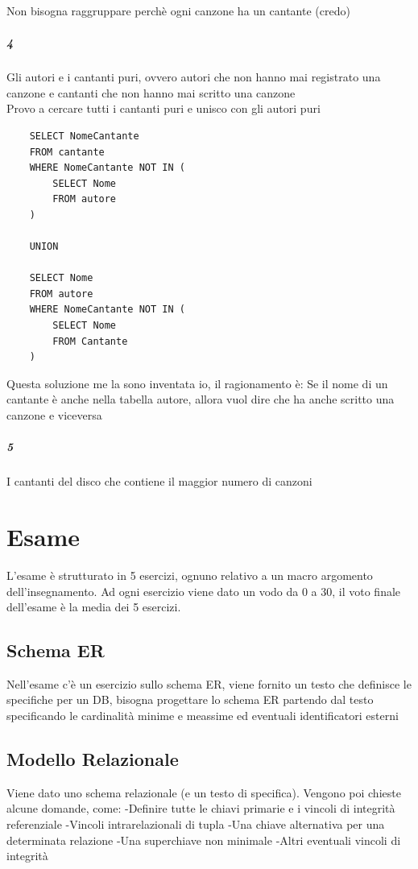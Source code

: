 \documentclass[12pt, a4paper, openany]{book}
\begin{document}
Non bisogna raggruppare perchè ogni canzone ha un cantante (credo)

\paragraph{4} Gli autori e i cantanti puri, ovvero autori che non hanno mai registrato una canzone e cantanti che non hanno mai scritto una canzone
\\Provo a cercare tutti i cantanti puri e unisco con gli autori puri
\begin{verbatim}
    SELECT NomeCantante
    FROM cantante
    WHERE NomeCantante NOT IN (
        SELECT Nome
        FROM autore
    )

    UNION

    SELECT Nome
    FROM autore
    WHERE NomeCantante NOT IN (
        SELECT Nome
        FROM Cantante
    )    
\end{verbatim}
Questa soluzione me la sono inventata io, il ragionamento è: Se il nome di un cantante è anche nella tabella autore, allora vuol dire che ha anche scritto una canzone e viceversa

\paragraph*{5} I cantanti del disco che contiene il maggior numero di canzoni


\chapter{Esame}


L'esame è strutturato in 5 esercizi, ognuno relativo a un macro argomento dell'insegnamento.
Ad ogni esercizio viene dato un vodo da 0 a 30, il voto finale dell'esame è la media dei 5 esercizi.

\section{Schema ER}
Nell'esame c'è un esercizio sullo schema ER, viene fornito un testo che definisce le specifiche per un DB, bisogna progettare lo schema ER partendo dal testo specificando
le cardinalità minime e meassime ed eventuali identificatori esterni

\section{Modello Relazionale}
Viene dato uno schema relazionale (e un testo di specifica). Vengono poi chieste alcune domande, come:
-Definire tutte le chiavi primarie e i vincoli di integrità referenziale
-Vincoli intrarelazionali di tupla
-Una chiave alternativa per una determinata relazione
-Una superchiave non minimale
-Altri eventuali vincoli di integrità
\end{document}
